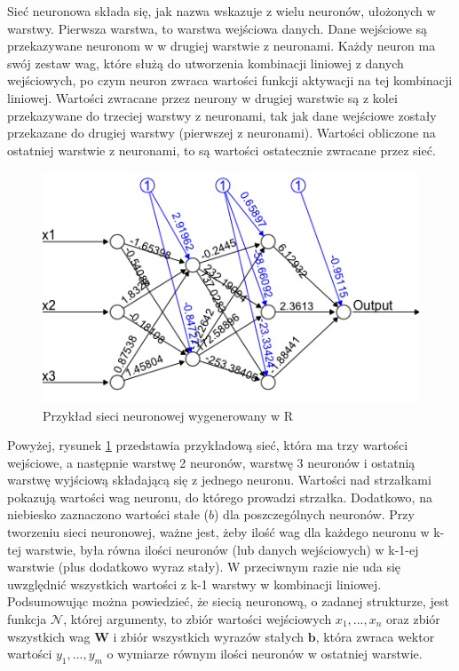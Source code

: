 \documentclass[licencjacka]{pracamgr}
\begin{document}
Sieć neuronowa składa się, jak nazwa wskazuje z wielu neuronów, ułożonych w warstwy. Pierwsza warstwa, to warstwa wejściowa danych. Dane wejściowe są przekazywane neuronom w w drugiej warstwie z neuronami. Każdy neuron ma swój zestaw wag, które służą do utworzenia kombinacji liniowej z danych wejściowych, po czym neuron zwraca wartości funkcji aktywacji na tej kombinacji liniowej. Wartości zwracane przez neurony w drugiej warstwie są z kolei przekazywane do trzeciej warstwy z neuronami, tak jak dane wejściowe zostały przekazane do drugiej warstwy (pierwszej z neuronami).  Wartości obliczone na ostatniej warstwie z neuronami, to są wartości ostatecznie zwracane przez sieć. 

\begin{figure}[h!]
	\includegraphics [scale=0.7]{nn_example.png}
	\caption{Przykład sieci neuronowej wygenerowany w R}
	\label{Rys22}
\end{figure}

Powyżej, rysunek \ref{Rys22} przedstawia przykładową sieć, która ma trzy wartości wejściowe, a następnie warstwę 2 neuronów, warstwę 3 neuronów i ostatnią warstwę wyjściową składającą się z jednego neuronu. Wartości nad strzałkami pokazują wartości wag neuronu, do którego prowadzi strzałka. Dodatkowo, na niebiesko zaznaczono wartości stałe ($b$) dla poszczególnych neuronów. Przy tworzeniu sieci neuronowej, ważne jest, żeby ilość wag dla każdego neuronu w k-tej warstwie, była równa ilości neuronów (lub danych wejściowych) w k-1-ej warstwie (plus dodatkowo wyraz stały). W przeciwnym razie nie uda się uwzględnić wszystkich wartości z k-1 warstwy w kombinacji liniowej.  \\
 
Podsumowując można powiedzieć, że siecią neuronową, o zadanej strukturze, jest funkcja $\mathbf{\mathcal{N}}$, której argumenty, to zbiór wartości wejściowych $x_{1},...,x_{n}$ oraz zbiór wszystkich wag $\mathbf{W}$ i zbiór wszystkich wyrazów stałych $\mathbf{b}$, która zwraca wektor wartości $y_{1},...,y_{m}$ o wymiarze równym ilości neuronów w ostatniej warstwie.
\end{document}
